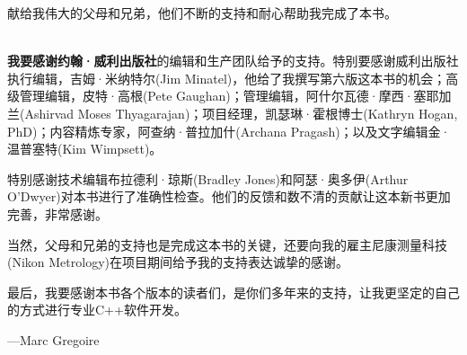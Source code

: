 献给我伟大的父母和兄弟，他们不断的支持和耐心帮助我完成了本书。

\hspace*{\fill} \\

\textbf{我要感谢约翰·威利出版社}的编辑和生产团队给予的支持。特别要感谢威利出版社执行编辑，吉姆·米纳特尔(Jim Minatel)，他给了我撰写第六版这本书的机会；高级管理编辑，皮特·高根(Pete Gaughan)；管理编辑，阿什尔瓦德·摩西·塞耶加兰(Ashirvad Moses Thyagarajan)；项目经理，凯瑟琳·霍根博士(Kathryn Hogan, PhD)；内容精炼专家，阿查纳·普拉加什(Archana Pragash)；以及文字编辑金·温普塞特(Kim Wimpsett)。

特别感谢技术编辑布拉德利·琼斯(Bradley Jones)和阿瑟·奥多伊(Arthur O’Dwyer)对本书进行了准确性检查。他们的反馈和数不清的贡献让这本新书更加完善，非常感谢。

当然，父母和兄弟的支持也是完成这本书的关键，还要向我的雇主尼康测量科技(Nikon Metrology)在项目期间给予我的支持表达诚挚的感谢。

最后，我要感谢本书各个版本的读者们，是你们多年来的支持，让我更坚定的自己的方式进行专业C++软件开发。

\begin{flushright}
—Marc Gregoire
\end{flushright}